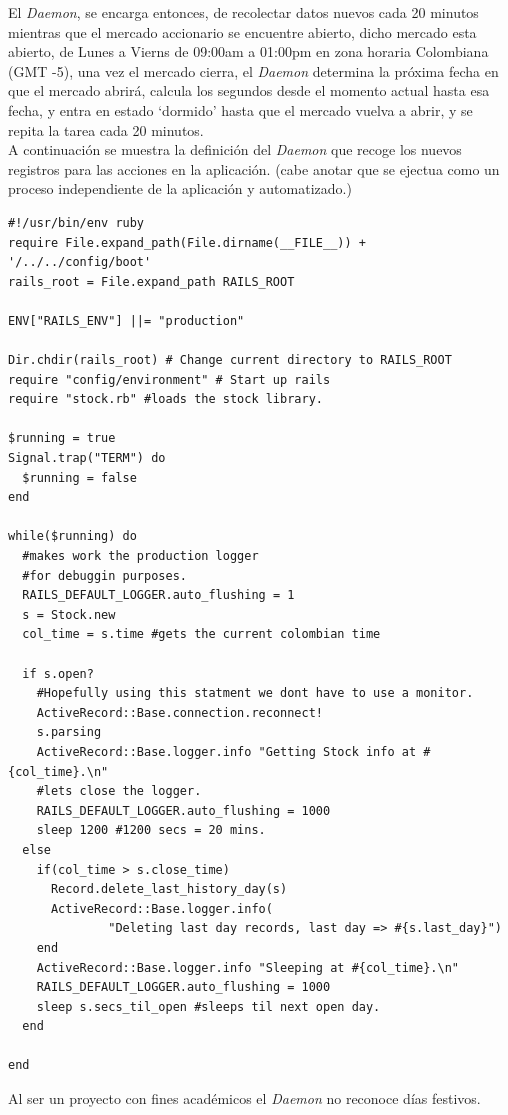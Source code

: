 El \emph{Daemon}, se encarga entonces, de recolectar datos nuevos cada 20 minutos mientras que el mercado accionario se encuentre abierto, dicho mercado esta abierto, de Lunes a Vierns de 09:00am a 01:00pm en zona horaria Colombiana (GMT -5), una vez el mercado cierra, el \emph{Daemon} determina la próxima fecha en que el mercado abrirá, calcula los segundos desde el momento actual hasta esa fecha, y entra en estado `dormido' hasta que el mercado vuelva a abrir, y se repita la tarea cada 20 minutos.\\

A continuación se muestra la definición del \emph{Daemon} que recoge los nuevos registros para las acciones en la aplicación. (cabe anotar que se ejectua como un proceso independiente de la aplicación y automatizado.)

\begin{verbatim}
#!/usr/bin/env ruby
require File.expand_path(File.dirname(__FILE__)) + '/../../config/boot' 
rails_root = File.expand_path RAILS_ROOT

ENV["RAILS_ENV"] ||= "production"

Dir.chdir(rails_root) # Change current directory to RAILS_ROOT 
require "config/environment" # Start up rails
require "stock.rb" #loads the stock library.

$running = true
Signal.trap("TERM") do 
  $running = false
end

while($running) do
  #makes work the production logger
  #for debuggin purposes.
  RAILS_DEFAULT_LOGGER.auto_flushing = 1
  s = Stock.new
  col_time = s.time #gets the current colombian time

  if s.open?
    #Hopefully using this statment we dont have to use a monitor.
    ActiveRecord::Base.connection.reconnect!
    s.parsing
    ActiveRecord::Base.logger.info "Getting Stock info at #{col_time}.\n"
    #lets close the logger.
    RAILS_DEFAULT_LOGGER.auto_flushing = 1000
    sleep 1200 #1200 secs = 20 mins.
  else
    if(col_time > s.close_time)
      Record.delete_last_history_day(s)
      ActiveRecord::Base.logger.info( 
	          "Deleting last day records, last day => #{s.last_day}")
    end
    ActiveRecord::Base.logger.info "Sleeping at #{col_time}.\n"
    RAILS_DEFAULT_LOGGER.auto_flushing = 1000
    sleep s.secs_til_open #sleeps til next open day.
  end

end
\end{verbatim}

Al ser un proyecto con fines académicos el \emph{Daemon} no reconoce días festivos.

